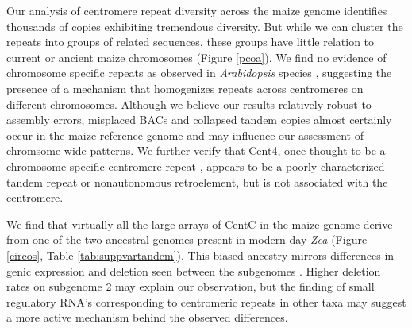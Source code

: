 Our analysis of centromere repeat diversity across the maize genome identifies thousands of copies exhibiting tremendous diversity. 
But while we can cluster the repeats into groups of related sequences, these groups have little relation to current or ancient maize chromosomes (Figure \ref{pcoa}).
We find no evidence of chromosome specific repeats as observed in \emph{Arabidopsis} species \citep{Kawabe2005, Pontes2004}, suggesting the presence of a mechanism that homogenizes repeats across centromeres on different chromosomes.
Although we believe our results relatively robust to assembly errors, misplaced BACs and collapsed tandem copies almost certainly occur in the maize  reference genome and may influence our assessment of chromsome-wide patterns.
We further verify that Cent4, once thought to be a chromosome-specific centromere repeat \citep{Page2001}, appears to be a poorly characterized tandem repeat or nonautonomous retroelement, but is not associated with the centromere.  

We find that virtually all the large arrays of CentC in the maize  genome derive from one of the two ancestral genomes present in modern day \emph{Zea} (Figure \ref{circos}, Table \ref{tab:suppvartandem}).  
This biased ancestry mirrors differences in genic expression and deletion seen between the subgenomes  \citep{Schnable2011}. Higher deletion rates on subgenome 2 may explain our observation, but the finding of small regulatory RNA’s corresponding to centromeric repeats \citet{ReinhartBartel2002} in other taxa may suggest a more active mechanism behind the observed differences.  



